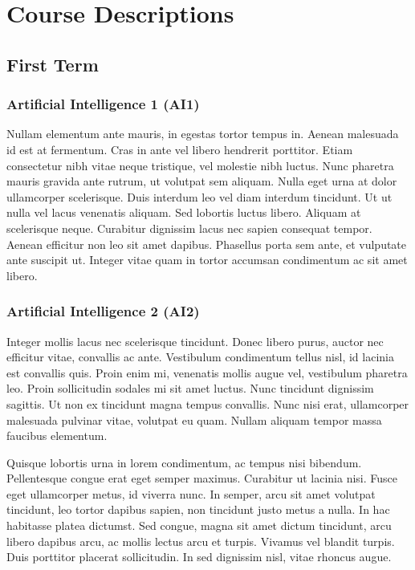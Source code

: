 \documentclass{article}
\begin{document}
\section{Course Descriptions}

\subsection{First Term}



\subsubsection{Artificial Intelligence 1 (AI1)}

Nullam elementum ante mauris, in egestas tortor tempus in. Aenean malesuada id est at fermentum. Cras in ante vel libero hendrerit porttitor. Etiam consectetur nibh vitae neque tristique, vel molestie nibh luctus. Nunc pharetra mauris gravida ante rutrum, ut volutpat sem aliquam. Nulla eget urna at dolor ullamcorper scelerisque. Duis interdum leo vel diam interdum tincidunt. Ut ut nulla vel lacus venenatis aliquam. Sed lobortis luctus libero. Aliquam at scelerisque neque. Curabitur dignissim lacus nec sapien consequat tempor. Aenean efficitur non leo sit amet dapibus. Phasellus porta sem ante, et vulputate ante suscipit ut. Integer vitae quam in tortor accumsan condimentum ac sit amet libero. 

\subsubsection{Artificial Intelligence 2 (AI2)}

Integer mollis lacus nec scelerisque tincidunt. Donec libero purus, auctor nec efficitur vitae, convallis ac ante. Vestibulum condimentum tellus nisl, id lacinia est convallis quis. Proin enim mi, venenatis mollis augue vel, vestibulum pharetra leo. Proin sollicitudin sodales mi sit amet luctus. Nunc tincidunt dignissim sagittis. Ut non ex tincidunt magna tempus convallis. Nunc nisi erat, ullamcorper malesuada pulvinar vitae, volutpat eu quam. Nullam aliquam tempor massa faucibus elementum.

Quisque lobortis urna in lorem condimentum, ac tempus nisi bibendum. Pellentesque congue erat eget semper maximus. Curabitur ut lacinia nisi. Fusce eget ullamcorper metus, id viverra nunc. In semper, arcu sit amet volutpat tincidunt, leo tortor dapibus sapien, non tincidunt justo metus a nulla. In hac habitasse platea dictumst. Sed congue, magna sit amet dictum tincidunt, arcu libero dapibus arcu, ac mollis lectus arcu et turpis. Vivamus vel blandit turpis. Duis porttitor placerat sollicitudin. In sed dignissim nisl, vitae rhoncus augue. 
\end{document}
